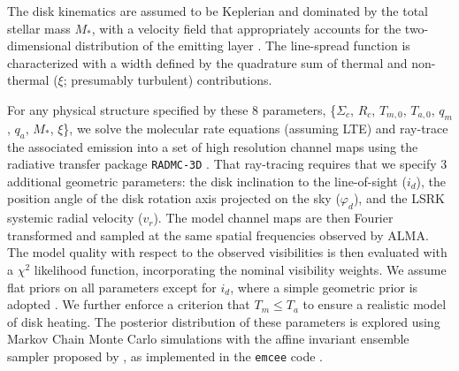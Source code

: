 \documentclass[twocolumn]{aastex61}
\begin{document}
The disk kinematics are assumed to be Keplerian and dominated by the total stellar mass $M_{\ast}$, with a velocity field that appropriately accounts for the two-dimensional distribution of the emitting layer \citep[see][]{rosenfeld13a}.  The  line-spread function is characterized with a width defined by the quadrature sum of thermal and non-thermal ($\xi$; presumably turbulent) contributions.

For any physical structure specified by these 8 parameters, \{$\Sigma_c$, $R_c$, $T_{m,0}$, $T_{a,0}$, $q_m$, $q_a$, $M_\ast$, $\xi$\}, we solve the molecular rate equations (assuming LTE) and ray-trace the associated emission into a set of high resolution channel maps using the radiative transfer package {\tt RADMC-3D} \citep{dullemond12}.  That ray-tracing requires that we specify 3 additional geometric parameters: the disk inclination to the line-of-sight ($i_d$), the position angle of the disk rotation axis projected on the sky ($\varphi_d$), and the LSRK systemic radial velocity ($v_r$).  The model channel maps are then Fourier transformed and sampled at the same spatial frequencies observed by ALMA.  The model quality with respect to the observed visibilities is then evaluated with a $\chi^2$ likelihood function, incorporating the nominal visibility weights.  We assume flat priors on all parameters except for $i_d$, where a simple geometric prior is adopted \citep{czekala16}.  We further enforce a criterion that $T_m \leq T_a$ to ensure a realistic model of disk heating.  The posterior distribution of these parameters is explored using Markov Chain Monte Carlo simulations with the affine invariant ensemble sampler proposed by \citet{goodman10}, as implemented in the {\tt emcee} code \citep{foreman-mackey13}.
\end{document}
